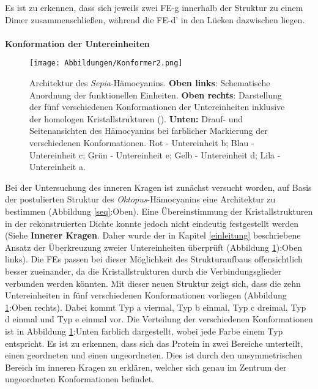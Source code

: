Es ist zu erkennen, dass sich jeweils zwei FE-g innerhalb der Struktur zu einem Dimer zusammenschließen, während die FE-d' in den Lücken dazwischen liegen.
\\
\\
\textbf{Konformation der Untereinheiten}\\
\begin{figure}[h!]
\texttt{[image: Abbildungen/Konformer2.png]}
\caption[Architektur des \textit{Sepia}-Hämocyanins]{Architektur des \textit{Sepia}-Hämocyanins. \textbf{Oben links}: Schematische Anordnung der funktionellen Einheiten. \textbf{Oben rechts}: Darstellung der fünf verschiedenen Konformationen der Untereinheiten inklusive der homologen Kristallstrukturen (\cite{pdb}). \textbf{Unten:} Drauf- und Seitenansichten des Hämocyanins bei farblicher Markierung der verschiedenen Konformationen. Rot - Untereinheit b; Blau - Untereinheit c; Grün - Untereinheit e; Gelb - Untereinheit d; Lila - Untereinheit a.}
\label{done}
\end{figure}
Bei der Untersuchung des inneren Kragen ist zunächst versucht worden, auf Basis der postulierten Struktur des \textit{Oktopus}-Hämocyanins eine Architektur zu bestimmen (Abbildung \ref{seq}:Oben).
Eine Übereinstimmung der Kristallstrukturen in der rekonstruierten Dichte konnte jedoch nicht eindeutig festgestellt werden (Siehe \textbf{Innerer Kragen}.
Daher wurde der in Kapitel \ref{einleitung} beschriebene Ansatz der Überkreuzung zweier Untereinheiten überprüft (Abbildung \ref{done}):Oben links).
Die FEs passen bei dieser Möglichkeit des Strukturaufbaus offensichtlich besser zueinander, da die Kristallstrukturen durch die Verbindungsglieder verbunden werden könnten.
Mit dieser neuen Struktur zeigt sich, dass die zehn Untereinheiten in fünf verschiedenen Konformationen vorliegen (Abbildung \ref{done}:Oben rechts).
Dabei kommt Typ a viermal, Typ b einmal, Typ c dreimal, Typ d einmal und Typ e einmal vor.
Die Verteilung der verschiedenen Konformationen ist in Abbildung \ref{done}:Unten farblich dargestellt, wobei jede Farbe einem Typ entspricht.
Es ist zu erkennen, dass sich das Protein in zwei Bereiche unterteilt, einen geordneten und einen ungeordneten.
Dies ist durch den unsymmetrischen Bereich im inneren Kragen zu erklären, welcher sich genau im Zentrum der ungeordneten Konformationen befindet.